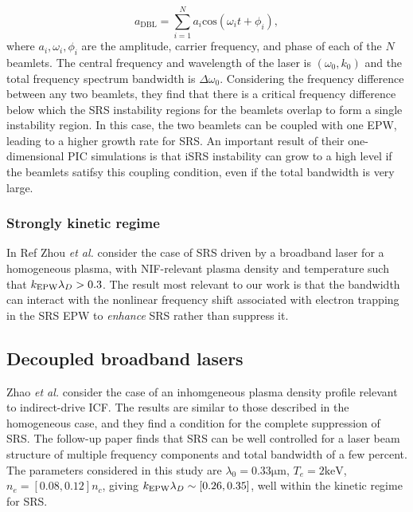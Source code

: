 \begin{equation}\label{eqn:DBL}
  a_{\mathrm{DBL}} = \sum_{i=1}^{N} a_i \mathrm{cos}(\omega_it + \phi_i),
\end{equation}
where $a_i,\omega_i,\phi_i$ are the amplitude, carrier frequency, and phase of
each of the $N$ beamlets. The central frequency and wavelength of the laser is
$(\omega_0,k_0)$ and the total frequency spectrum bandwidth is
$\Delta\omega_0$.
Considering the frequency difference between any two beamlets, they find that
there is a critical frequency difference below which the SRS instability regions
for the beamlets overlap to form a single instability region. In this case, the
two beamlets can be coupled with one EPW, leading to a higher growth rate for
SRS. An important result of their one-dimensional PIC simulations is that iSRS
instability can grow to a high level if the beamlets satifsy this coupling
condition, even if the total bandwidth is very large.

\subsubsection{Strongly kinetic regime}
In Ref \cite{zhou_kinetic_2018} Zhou \textit{et al.} consider the case of SRS
driven by a broadband laser for a homogeneous plasma, with NIF-relevant plasma
density and temperature such that $k_\mathrm{EPW}\lambda_D > 0.3$. The result most relevant to our
work is that the bandwidth can interact with the nonlinear frequency shift associated
with electron trapping in the SRS EPW to \emph{enhance} SRS rather than suppress it.


\subsection{Decoupled broadband lasers}
Zhao \textit{et al.} \cite{zhao_effective_2017} consider the case of an
inhomgeneous plasma density profile relevant to indirect-drive ICF. The results
are similar to those described in the homogeneous case, and they find a
condition for the complete suppression of SRS. The follow-up paper
\cite{zhao_suppression_2019} finds that SRS can be well controlled for a laser
beam structure of multiple frequency components and total bandwidth of a few
percent. The parameters considered in this study are
$\lambda_0=0.33\si{\micro\metre}$,
$T_e=2\si{\kilo\electronvolt}$, $n_e = [0.08,0.12]n_c$, giving $k_\mathrm{EPW}\lambda_D \sim
[0.26,0.35]$, well within the kinetic regime for SRS.

